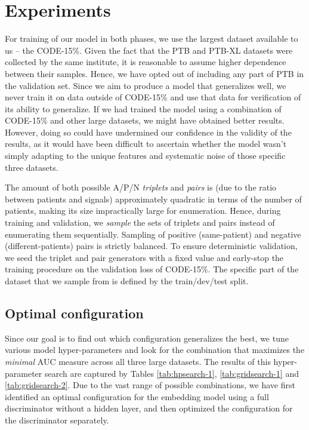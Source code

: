 \documentclass[preprint,12pt]{elsarticle}
\begin{document}
\section{Experiments}

For training of our model in both phases, we use the largest dataset available to us -- the CODE-15\%. Given the fact that the PTB and PTB-XL datasets were collected by the same institute, it is reasonable to assume higher dependence between their samples. Hence, we have opted out of including any part of PTB in the validation set. Since we aim to produce a model that generalizes well, we never train it on data outside of CODE-15\% and use that data for verification of its ability to generalize. If we had trained the model using a combination of CODE-15\% and other large datasets, we might have obtained better results. However, doing so could have undermined our confidence in the validity of the results, as it would have been difficult to ascertain whether the model wasn't simply adapting to the unique features and systematic noise of those specific three datasets.



The amount of both possible A/P/N \textit{triplets} and \textit{pairs} is (due to the ratio between patients and signals) approximately quadratic in terms of the number of patients, making its size impractically large for enumeration. Hence, during training and validation, we \textit{sample} the sets of triplets and pairs instead of enumerating them sequentially. Sampling of positive (same-patient) and negative (different-patients) pairs is strictly balanced. To ensure deterministic validation, we seed the triplet and pair generators with a fixed value and early-stop the training procedure on the validation loss of CODE-15\%. The specific part of the dataset that we sample from is defined by the train/dev/test split.



\subsection{Optimal configuration}

Since our goal is to find out which configuration generalizes the best, we tune various model hyper-parameters and look for the combination that maximizes the \textit{minimal} AUC measure across all three large datasets. The results of this hyper-parameter search are captured by Tables \ref{tab:hpsearch-1},  \ref{tab:gridsearch-1} and \ref{tab:gridsearch-2}. Due to the vast range of possible combinations, we have first identified an optimal configuration for the embedding model using a full discriminator without a hidden layer, and then optimized the configuration for the discriminator separately.
\end{document}
